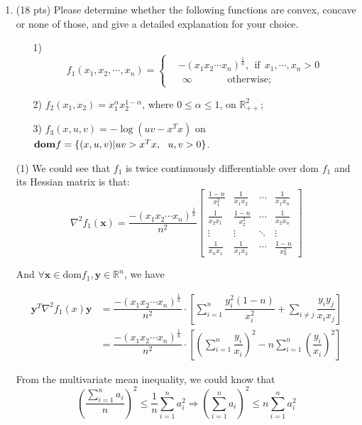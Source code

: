 \documentclass[10pt]{article}
\renewcommand{\mathbf}{\boldsymbol}
\begin{document}
\begin{enumerate}
\newpage

\item {\color{red} (18 pts)} Please determine whether the following functions are convex, concave or none of those, and give a detailed explanation for your choice.
\begin{itemize}
    \item[1)] 
     \begin{equation*}
     f_1(x_1,x_2,\cdots,x_n)=
      \begin{cases}
         &-(x_1x_2\cdots x_n)^{\frac{1}n},~~ \text{if}~~x_1,\cdots,x_n>0\\
         &~~\infty ~~~~~~~~~~~~~~~~\text{otherwise};\
       \end{cases}
     \end{equation*}
    \item[2)] $f_2(x_1,x_2)= x_1^\alpha x_2^{1-\alpha}$, where $0\leq\alpha\leq1$, on $\mathbb{R}_{++}^2$;
    \item[3)] $f_3(x,u,v)=-\log(uv-x^Tx)$ on ${\bf dom} f =\{(x,u,v)|uv>x^Tx,~~u,v>0\}$.
\end{itemize}


(1) We could see that $f_1$ is twice continuously differentiable over dom $f_1$ and its Hessian matrix is that:
$$
\nabla^2 f_1(\mathbf{x})=\dfrac{-(x_1x_2\cdots x_n)^{\frac{1}{n}}}{n^2}\left[\begin{array}{cccc}
\frac{1-n}{x_1^2} & \frac{1}{x_1 x_2} & \cdots & \frac{1}{x_1 x_n} \\
\frac{1}{x_2 x_1} & \frac{1-n}{x_2^2} & \cdots & \frac{1}{x_2 x_n} \\
\vdots & \vdots & \ddots & \vdots \\
\frac{1}{x_n x_1} & \frac{1}{x_1 x_2} & \cdots & \frac{1-n}{x_n^2}
\end{array}\right]
$$

And $\forall \mathbf{x}\in\text{dom} f_1,\mathbf{y}\in\mathbb{R}^n$, we have

\begin{align*}
    \mathbf{y}^T\nabla^2 f_1(x)\mathbf{y} &= \dfrac{-(x_1x_2\cdots x_n)^{\frac{1}{n}}}{n^2}\cdot \left[\sum_{i=1}^n\dfrac{y_i^2(1-n)}{x_i^2}+\sum_{i\neq j}\dfrac{y_iy_j}{x_ix_j}\right] \\
    &= \dfrac{-(x_1x_2\cdots x_n)^{\frac{1}{n}}}{n^2}\cdot \left[\left(\sum_{i=1}^n\dfrac{y_i}{x_i}\right)^2-n\sum_{i=1}^n\left(\dfrac{y_i}{x_i}\right)^2\right]
\end{align*}

From the multivariate mean inequality, we could know that
$$\left(\dfrac{\sum_{i=1}^na_i}{n}\right)^2\leq \dfrac{1}{n}\sum_{i=1}^na_i^2 \Rightarrow \left(\sum_{i=1}^na_i\right)^2\leq n\sum_{i=1}^na_i^2$$


\end{enumerate}
\end{document}
